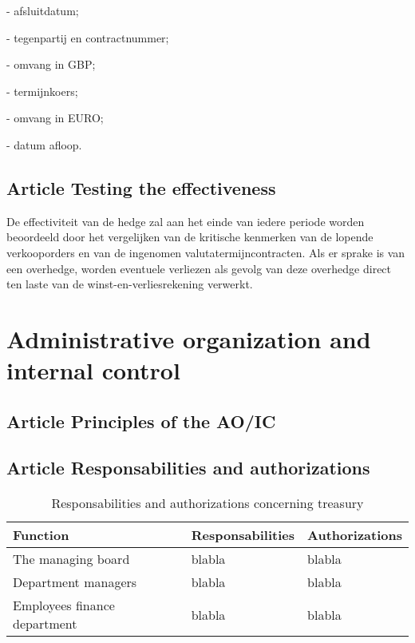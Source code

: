 - afsluitdatum;

- tegenpartij en contractnummer;

- omvang in GBP;

- termijnkoers;

- omvang in EURO;

- datum afloop.


\subsection*{Article \theartikel \hspace{1em} Testing the effectiveness}
De effectiviteit van de hedge zal aan het einde van iedere periode worden beoordeeld door het vergelijken van de kritische kenmerken van de lopende verkooporders en van de ingenomen valutatermijncontracten. Als er sprake is van een overhedge, worden eventuele verliezen als gevolg van deze overhedge direct ten laste van de winst-en-verliesrekening verwerkt.



\newpage
\section*{Administrative organization and internal control}
\subsection*{Article \theartikel \hspace{1em} Principles of the AO/IC}


\subsection*{Article \theartikel \hspace{1em} Responsabilities and authorizations}

\begin{table}[!h]
    \centering
    \caption{Responsabilities and authorizations concerning treasury}
    \begin{tabular}{l l l}
        \toprule
        \textbf{Function} & \textbf{Responsabilities} & \textbf{Authorizations} \\
        \midrule
        The managing board & blabla & blabla \\
        Department managers & blabla & blabla \\
        Employees finance department & blabla & blabla \\
        \bottomrule
    \end{tabular}
    \label{tab:functiescheiding}
\end{table}


